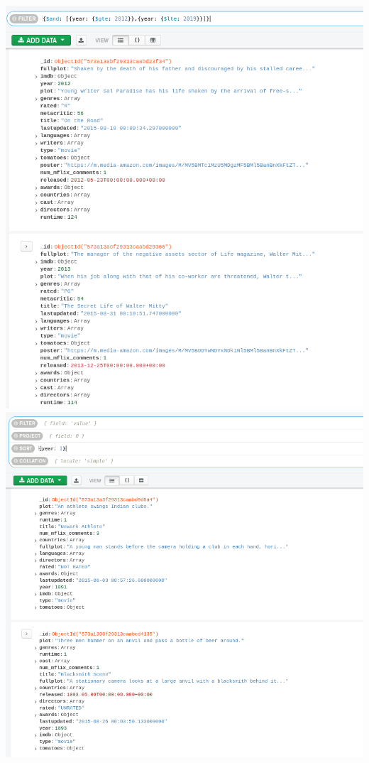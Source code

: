 \documentclass[10pt]{article}
\begin{document}
\begin{center}
  \includegraphics[scale=0.35]{imgs/ej2_3.png}\\
  \includegraphics[scale=0.35]{imgs/ej2_4.png}\\

\end{center}
\end{document}
